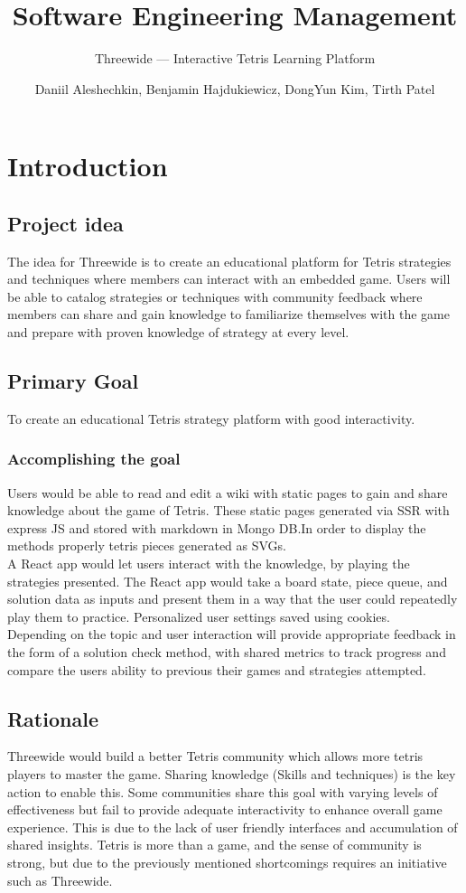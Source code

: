 \documentclass[english,course]{lecture}
\title{Software Engineering Management}
\subtitle{Threewide --- Interactive Tetris Learning Platform}
\author{Daniil Aleshechkin, Benjamin Hajdukiewicz, DongYun Kim, Tirth Patel}
\begin{document}
%
\section{Introduction}
\subsection*{Project idea}
The idea for Threewide is to create an educational platform for Tetris strategies and techniques where members can interact with an embedded game. Users will be able to catalog strategies or techniques with community feedback where members can share and gain knowledge to familiarize themselves with the game and prepare with proven knowledge of strategy at every level.
%
\subsection*{Primary Goal}
To create an educational Tetris strategy platform with good interactivity.
%
\subsubsection*{Accomplishing the goal}
Users would be able to read and edit a wiki with static pages to gain and share knowledge about the game of Tetris. These static pages generated via SSR with express JS and stored with markdown in Mongo DB.\@ In order to display the methods properly tetris pieces generated as SVGs.
%
\\A React app would let users interact with the knowledge, by playing the strategies presented. The React app would take a board state, piece queue, and solution data as inputs and present them in a way that the user could repeatedly play them to practice. Personalized user settings saved using cookies.
%
\\Depending on the topic and user interaction will provide appropriate feedback in the form of a solution check method, with shared metrics to track progress and compare the users ability to previous their games and strategies attempted.
%
\subsection*{Rationale}
Threewide would build a better Tetris community which allows more tetris players to master the game. Sharing knowledge (Skills and techniques) is the key action to enable this. Some communities share this goal with varying levels of effectiveness but fail to provide adequate interactivity to enhance overall game experience. This is due to the lack of user friendly interfaces and accumulation of shared insights. Tetris is more than a game, and the sense of community is strong, but due to the previously mentioned shortcomings requires an initiative such as Threewide.
%
\end{document}
